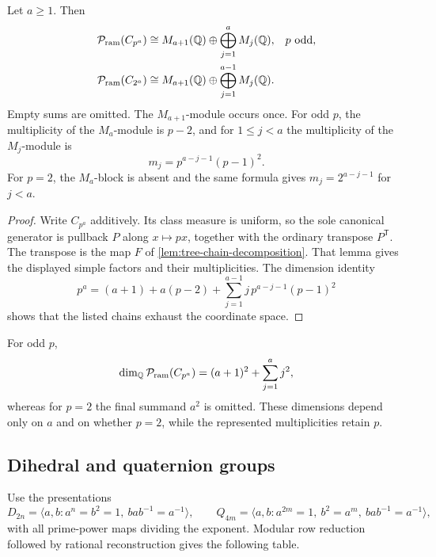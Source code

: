 \begin{theorem}
\label{thm:cyclic-prime-powers}
Let \(a\geq1\).  Then
\begin{align}
 \mathcal P_{\mathrm{ram}}(C_{p^a})
 &\cong
 M_{a+1}(\mathbb Q)\oplus\bigoplus_{j=1}^{a}M_j(\mathbb Q),
 &&p\text{ odd},                                      \label{eq:cyclic-odd}\\
 \mathcal P_{\mathrm{ram}}(C_{2^a})
 &\cong
 M_{a+1}(\mathbb Q)\oplus\bigoplus_{j=1}^{a-1}M_j(\mathbb Q).
 &&                                                   \label{eq:cyclic-two}
\end{align}
Empty sums are omitted.  The \(M_{a+1}\)-module occurs once.  For odd \(p\),
the multiplicity of the \(M_a\)-module is \(p-2\), and for \(1\leq j<a\)
the multiplicity of the \(M_j\)-module is
\[
 m_j=p^{a-j-1}(p-1)^2.
\]
For \(p=2\), the \(M_a\)-block is absent and the same formula gives
\(m_j=2^{a-j-1}\) for \(j<a\).
\end{theorem}

\begin{proof}
Write \(C_{p^a}\) additively.  Its class measure is uniform, so the sole
canonical generator is pullback \(P\) along \(x\mapsto px\), together with
the ordinary transpose \(P^{\mathsf T}\).  The transpose is the map \(F\)
of \cref{lem:tree-chain-decomposition}.  That lemma gives the displayed
simple factors and their multiplicities.  The dimension identity
\[
 p^a=(a+1)+a(p-2)+
 \sum_{j=1}^{a-1}j\,p^{a-j-1}(p-1)^2
\]
shows that the listed chains exhaust the coordinate space.
\end{proof}

\begin{corollary}
\label{cor:cyclic-prime-power-dimensions}
For odd \(p\),
\[
 \dim_\mathbb Q\mathcal P_{\mathrm{ram}}(C_{p^a})
 =(a+1)^2+\sum_{j=1}^{a}j^2,
\]
whereas for \(p=2\) the final summand \(a^2\) is omitted.  These dimensions
depend only on \(a\) and on whether \(p=2\), while the represented
multiplicities retain \(p\).
\end{corollary}

\subsection{Dihedral and quaternion groups}
\label{sec:family-ladder}

Use the presentations
\[
 D_{2n}=\langle a,b:a^{n}=b^2=1,\ bab^{-1}=a^{-1}\rangle,
 \qquad
 Q_{4m}=\langle a,b:a^{2m}=1,\ b^2=a^m,\ bab^{-1}=a^{-1}\rangle,
\]
with all prime-power maps dividing the exponent.  Modular row reduction
followed by rational reconstruction gives the following table.

